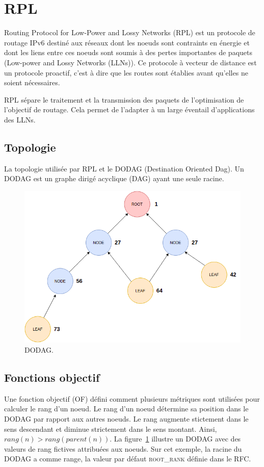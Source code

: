 \newpage
\section{RPL}\label{sec:state-rpl}
\renewcommand{\rightmark}{RPL}

Routing Protocol for Low-Power and Lossy Networks (RPL) est un protocole de routage IPv6 destiné aux réseaux dont les noeuds sont contraints en énergie et dont les liens entre ces noeuds sont soumis à des pertes importantes de paquets (Low-power and Lossy Networks (LLNs)).
Ce protocole à vecteur de distance est un protocole proactif, c'est à dire que les routes sont établies avant qu'elles ne soient nécessaires.

RPL sépare le traitement et la transmission des paquets de l'optimisation de l'objectif de routage. Cela permet de l'adapter à un large éventail d'applications des LLNs.

\subsection*{Topologie}
La topologie utilisée par RPL et le DODAG (Destination Oriented Dag). Un DODAG est un graphe dirigé acyclique (DAG) ayant une seule racine.
\begin{figure}[H]
    \centering
    \includegraphics[scale=0.45]{res/dodag.drawio.png}
    \caption{DODAG.}
    \label{fig:state-dodag}
\end{figure}


\subsection*{Fonctions objectif}
Une fonction objectif (OF) défini comment plusieurs métriques sont utilisées pour calculer le rang d'un noeud. Le rang d'un noeud détermine sa position dans le DODAG par rapport aux autres noeuds.
Le rang augmente stictement dans le sens descendant et diminue strictement dans le sens montant. Ainsi, $rang(n)>rang(parent(n))$. La figure~\ref{fig:state-dodag} illustre un DODAG avec des valeurs de rang fictives attribuées aux noeuds. Sur cet exemple, la racine du DODAG a comme range, la valeur par défaut \textsc{root\_rank} définie dans le RFC.

